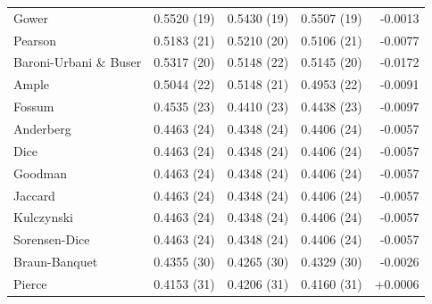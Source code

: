 \begin{table}[t]
{\begin{tabular}{lrrrr}
Gower & 0.5520 (19) & 0.5430 (19) & 0.5507 (19) & -0.0013 \\
Pearson & 0.5183 (21) & 0.5210 (20) & 0.5106 (21) & -0.0077 \\
Baroni-Urbani \& Buser & 0.5317 (20) & 0.5148 (22) & 0.5145 (20) & -0.0172 \\
Ample & 0.5044 (22) & 0.5148 (21) & 0.4953 (22) & -0.0091 \\
Fossum & 0.4535 (23) & 0.4410 (23) & 0.4438 (23) & -0.0097 \\
Anderberg & 0.4463 (24) & 0.4348 (24) & 0.4406 (24) & -0.0057 \\
Dice & 0.4463 (24) & 0.4348 (24) & 0.4406 (24) & -0.0057 \\
Goodman & 0.4463 (24) & 0.4348 (24) & 0.4406 (24) & -0.0057 \\
Jaccard & 0.4463 (24) & 0.4348 (24) & 0.4406 (24) & -0.0057 \\
Kulczynski & 0.4463 (24) & 0.4348 (24) & 0.4406 (24) & -0.0057 \\
Sorensen-Dice & 0.4463 (24) & 0.4348 (24) & 0.4406 (24) & -0.0057 \\
Braun-Banquet & 0.4355 (30) & 0.4265 (30) & 0.4329 (30) & -0.0026 \\
Pierce & 0.4153 (31) & 0.4206 (31) & 0.4160 (31) & +0.0006 \\
\bottomrule
\end{tabular}
}
\end{table}
